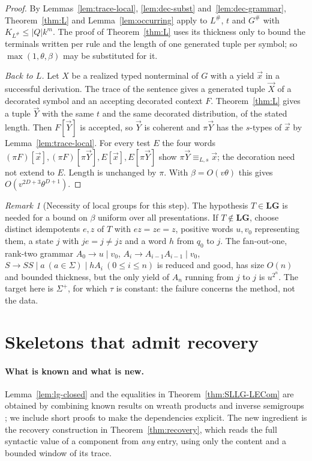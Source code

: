 \documentclass[11pt]{article}
\numberwithin{equation}{section}
\theoremstyle{plain}
\theoremstyle{definition}
\theoremstyle{remark}
\newtheorem{remark}[theorem]{Remark}
\theoremstyle{plain}
\newcommand{\tuple}[1]{\vec{#1}}
\newcommand{\LG}{\mathbf{LG}}
\begin{document}
\begin{proof}
By Lemmas~\ref{lem:trace-local}, \ref{lem:dec-subst} and~\ref{lem:dec-grammar},
Theorem~\ref{thm:L} and Lemma~\ref{lem:occurring} apply to $L^\#$, $t$ and
$G^\#$ with $K_{L^\#}\le|Q|k^m$.  The proof of Theorem~\ref{thm:L} uses its
thickness only to bound the terminals written per rule and the length of one
generated tuple per symbol; so $\max(1,\theta,\beta)$ may be substituted for it.

\emph{Back to $L$.}  Let $X$ be a realized typed nonterminal of $G$ with a yield
$\tuple x$ in a successful derivation.  The trace of the sentence gives a
generated tuple $\tuple X$ of a decorated symbol and an accepting decorated
context $F$.  Theorem~\ref{thm:L} gives a tuple $\tuple Y$ with the same $t$ and
the same decorated distribution, of the stated length.  Then $F[\tuple Y]$ is
accepted, so $\tuple Y$ is coherent and $\pi\tuple Y$ has the $s$-types of
$\tuple x$ by Lemma~\ref{lem:trace-local}.  For every test $E$ the four words
$(\pi F)[\tuple x],(\pi F)[\pi\tuple Y],E[\tuple x],E[\pi\tuple Y]$ show
$\pi\tuple Y\equiv_{L,s}\tuple x$; the decoration need not extend to $E$.  Length
is unchanged by $\pi$.  With $\beta=O(v\theta)$ this gives
$O(v^{2D+3}\theta^{D+1})$.
\end{proof}

\begin{remark}[Necessity of local groups for this step]
\label{rem:lg-needed-for-witnesses}
The hypothesis $T\in\LG$ is needed for a bound on $\beta$ uniform over all
presentations.  If $T\notin\LG$, choose distinct idempotents $e,z$ of $T$ with
$ez=ze=z$, positive words $u,v_0$ representing them, a state $j$ with $je=j\ne jz$
and a word $h$ from $q_0$ to $j$.  The fan-out-one, rank-two grammar
$A_0\to u\mid v_0$, $A_i\to A_{i-1}A_{i-1}\mid v_0$,
$S\to SS\mid a\ (a\in\Sigma)\mid hA_i\ (0\le i\le n)$ is reduced and good, has
size $O(n)$ and bounded thickness, but the only yield of $A_n$ running from $j$ to
$j$ is $u^{2^n}$.  The target here is $\Sigma^+$, for which $\tau$ is constant:
the failure concerns the method, not the data.
\end{remark}

\section{Skeletons that admit recovery}
\label{sec:algebra}

\paragraph{What is known and what is new.}
Lemma~\ref{lem:lg-closed} and the equalities in Theorem~\ref{thm:SLLG-LECom} are
obtained by combining known results on wreath products and inverse semigroups
\cite{TherienWeiss1985,Ash1987,McAlister1974,OCarroll1976,Tilson1987}; we
include short proofs to make the dependencies explicit.  The new ingredient is
the recovery construction in Theorem~\ref{thm:recovery}, which reads the full
syntactic value of a component from \emph{any} entry, using only the content and
a bounded window of its trace.
\end{document}
